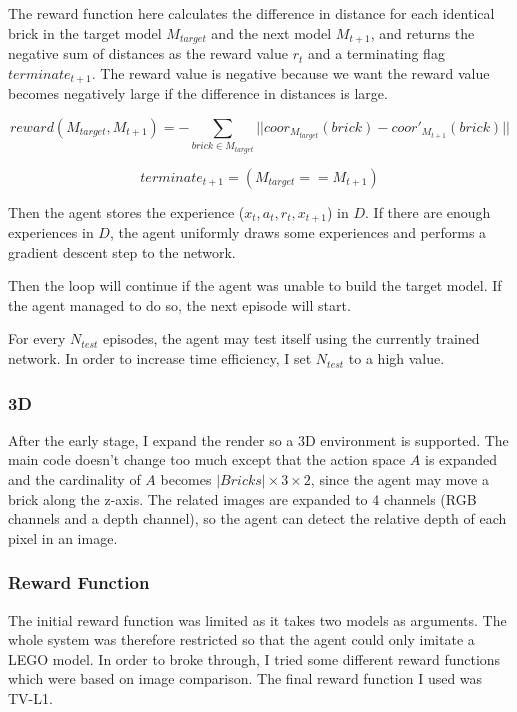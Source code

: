 \documentclass[a4paper]{article}
\begin{document}
		        The reward function here calculates the difference in distance for each identical brick in the target model $M_{target}$ and the next model $M_{t+1}$, and returns the negative sum of distances as the reward value $r_t$ and a terminating flag $terminate_{t+1}$. The reward value is negative because we want the reward value becomes negatively large if the difference in distances is large.
		        
		        \begin{equation*}
			        reward(M_{target}, M_{t+1}) = - \sum_{brick \in M_{target}} ||coor_{M_{target}}(brick) - coor'_{M_{t+1}}(brick)||
		        \end{equation*} 
		        
		        \begin{equation*}
			        terminate_{t+1} = (M_{target} == M_{t+1})
		        \end{equation*}
		        
		        Then the agent stores the experience ($x_t,a_t,r_t,x_{t+1}$) in $D$. If there are enough experiences in $D$, the agent uniformly draws some experiences and performs a gradient descent step to the network. 
		        
		        Then the loop will continue if the agent was unable to build the target model. If the agent managed to do so, the next episode will start. 
		        
		        \vspace{5mm}
		        
		        For every $N_{test}$ episodes, the agent may test itself using the currently trained network. In order to increase time efficiency, I set $N_{test}$ to a high value.
		        
		    \subsubsection{3D}
		    	After the early stage, I expand the render so a 3D environment is supported. The main code doesn't change too much except that the action space $A$ is expanded and the cardinality of $A$ becomes $|Bricks| \times 3 \times 2$, since the agent may move a brick along the z-axis. The related images are expanded to 4 channels (RGB channels and a depth channel), so the agent can detect the relative depth of each pixel in an image.  
		    	
        	\subsubsection{Reward Function}
        		The initial reward function was limited as it takes two models as arguments. The whole system was therefore restricted so that the agent could only imitate a LEGO model. In order to broke through, I tried some different reward functions which were based on image comparison. The final reward function I used was TV-L1\cite{tvl1}. 
        		
\end{document}
